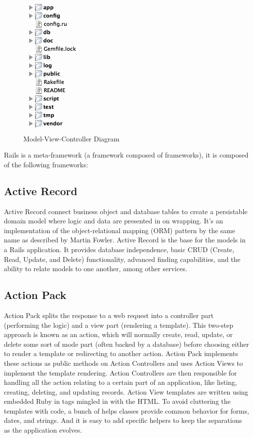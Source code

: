 \begin{figure}[h!]
  \caption{Model-View-Controller Diagram}
  \centering
  \includegraphics[scale=0.75]{Images/rails_files}
\end{figure}

Rails is a meta-framework (a framework composed of frameworks), it is composed of the following frameworks:

\subsection{Active Record}
Active Record connect business object and database tables to create a persistable domain model where logic and data are presented in on wrapping. It’s an implementation of the object-relational mapping (ORM) pattern by the same name as described by Martin Fowler.
Active Record is the base for the models in a Rails application. It provides database independence, basic CRUD (Create, Read, Update, and Delete) functionality, advanced finding capabilities, and the ability to relate models to one another, among other services.

\subsection{Action Pack} 
Action Pack splits the response to a web request into a controller part (performing the logic) and a view part (rendering a template). This two-step approach is known as an action, which will normally create, read, update, or delete some sort of mode part (often backed by a database) before choosing either to render a template or redirecting to another action.
Action Pack implements these actions as public methods on Action Controllers and uses Action Views to implement the template rendering. Action Controllers are then responsible for handling all the action relating to a certain part of an application, like listing, creating, deleting, and updating records.
Action View templates are written using embedded Ruby in tags mingled in with the HTML. To avoid cluttering the templates with code, a bunch of helps classes provide common behavior for forms, dates, and strings. And it is easy to add specific helpers to keep the separations as the application evolves.

